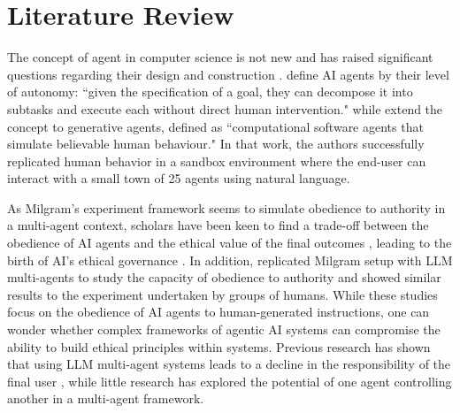 \section{Literature Review}

The concept of agent in computer science is not new and has raised significant questions regarding their design and construction \citep{Durfee1990, Wooldridge1995}. \citet{Ghosh2025} define AI agents by their level of autonomy: “given the specification of a goal, they can decompose it into subtasks and execute each without direct human intervention." while \citet{park2023generative} extend the concept to generative agents, defined as “computational software agents that simulate believable human behaviour." In that work, the authors successfully replicated human behavior in a sandbox environment where the end-user can interact with a small town of 25 agents using natural language. 


As Milgram's experiment framework seems to simulate obedience to authority in a multi-agent context, scholars have been keen to find a trade-off between the obedience of AI agents and the ethical value of the final outcomes \citep{Milli2017}, leading to the birth of AI’s ethical governance \citep{McLarney2021}. In addition, \citet{Aher2023} replicated Milgram setup with LLM multi-agents to study the capacity of obedience to authority and showed similar results to the experiment undertaken by groups of humans. While these studies focus on the obedience of AI agents to human-generated instructions, one can wonder whether complex frameworks of agentic AI systems can compromise the ability to build ethical principles within systems. Previous research has shown that using LLM multi-agent systems leads to a decline in the responsibility of the final user \citep{Ghasemaghaei2024}, while little research has explored the potential of one agent controlling another in a multi-agent framework.


